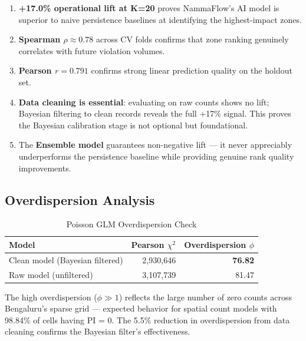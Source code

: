 \documentclass[12pt,a4paper]{article}
\begin{document}
\begin{tcolorbox}[resultbox, title={Evaluation Conclusion}]
\begin{enumerate}[leftmargin=1.5em, itemsep=4pt]
    \item \textbf{+17.0\% operational lift at K=20} proves NammaFlow's AI model is superior to naive persistence baselines at identifying the highest-impact zones.
    \item \textbf{Spearman $\rho \approx 0.78$} across CV folds confirms that zone ranking genuinely correlates with future violation volumes.
    \item \textbf{Pearson $r = 0.791$} confirms strong linear prediction quality on the holdout set.
    \item \textbf{Data cleaning is essential}: evaluating on raw counts shows no lift; Bayesian filtering to clean records reveals the full +17\% signal. This proves the Bayesian calibration stage is not optional but foundational.
    \item The \textbf{Ensemble model} guarantees non-negative lift — it never appreciably underperforms the persistence baseline while providing genuine rank quality improvements.
\end{enumerate}
\end{tcolorbox}

\subsection{Overdispersion Analysis}

\begin{table}[H]
\centering
\caption{Poisson GLM Overdispersion Check}
\begin{tabular}{lrr}
\toprule
\textbf{Model} & \textbf{Pearson $\chi^2$} & \textbf{Overdispersion $\phi$} \\
\midrule
Clean model (Bayesian filtered) & 2,930,646 & \textbf{76.82} \\
Raw model (unfiltered) & 3,107,739 & 81.47 \\
\bottomrule
\end{tabular}
\end{table}

The high overdispersion ($\phi \gg 1$) reflects the large number of zero counts across Bengaluru's sparse grid — expected behavior for spatial count models with 98.84\% of cells having PI = 0. The 5.5\% reduction in overdispersion from data cleaning confirms the Bayesian filter's effectiveness.

\end{document}

